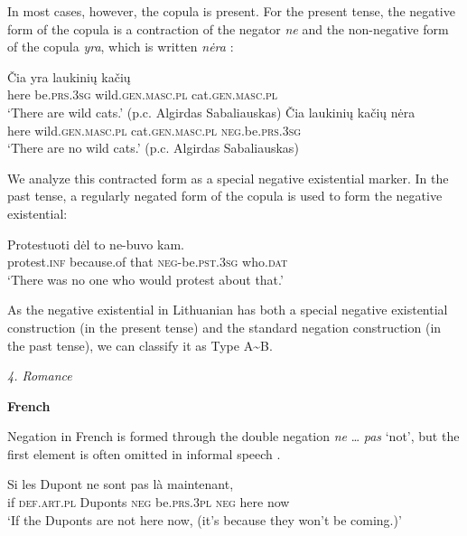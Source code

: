 ﻿\documentclass[output=paper]{langsci/langscibook}
\begin{document}
\begin{unindented}
In most cases, however, the copula is present. For the present tense, the negative form of the copula is a contraction of the negator \textit{ne} and the non-negative form of the copula \textit{yra}, which is written \textit{nėra} \citep[1976]{Mathiassen1996}:
%
\begin{exe}\ex \gll Čia yra laukinių kačių \\
here be.\textsc{prs.3sg} wild.\textsc{gen.masc.pl} cat.\textsc{gen.masc.pl} \\
    \glt `There are wild cats.' (p.c. Algirdas Sabaliauskas)
\ex \gll Čia laukinių kačių nėra \\
here  wild.\textsc{gen.masc.pl} cat.\textsc{gen.masc.pl} \textsc{neg}.be.\textsc{prs.3sg} \\
    \glt `There are no wild cats.' (p.c. Algirdas Sabaliauskas)
    \end{exe}

We analyze this contracted form as a special negative existential marker. In the past tense, a regularly negated form of the copula is used to form the negative existential:
%
\begin{exe}\ex \gll Protestuoti dėl to ne-buvo kam. \\
protest.\textsc{inf} because.of that \textsc{neg}-be.\textsc{pst.3sg} who.\textsc{dat} \\
    \glt `There was no one who would protest about that.' \parencite[134]{Kaledaite2008}
    \end{exe}

As the negative existential in Lithuanian has both a special negative existential construction (in the present tense) and the standard negation construction (in the past tense), we can classify it as Type A{\textasciitilde}B.

\textit{4. Romance}

\textbf{French}

Negation in French is formed through the double negation \textit{ne} …
\textit{pas} `not', but the first element is often omitted in informal
speech \parencite[219]{LangPerez2004}.
%
\begin{exe}\ex \gll Si les Dupont ne sont pas là maintenant, \\
if  \textsc{def.art.pl} Duponts \textsc{neg} be.\textsc{prs.3pl} \textsc{neg} here now \\
    \glt `If the Duponts are not here now, (it's because they won't be coming.)’ \parencite[219]{LangPerez2004}
    \end{exe}


\end{unindented}
\end{document}

